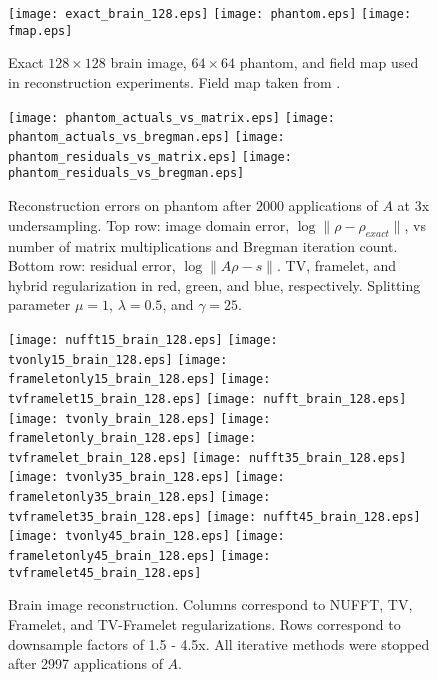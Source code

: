 \documentclass[12pt]{amsart}
\theoremstyle{remark}
\begin{document}
\begin{center}
\begin{figure}[h!]
\texttt{[image: exact\_brain\_128.eps]}
\texttt{[image: phantom.eps]}
\texttt{[image: fmap.eps]}
\caption{Exact $128 \times 128$ brain image, $64 \times 64$ phantom, and field map used in reconstruction experiments. Field map taken from \cite{Fessler2003}.}
\end{figure}
\end{center}


\begin{center}
\begin{figure}[h!]
\texttt{[image: phantom\_actuals\_vs\_matrix.eps]}
\texttt{[image: phantom\_actuals\_vs\_bregman.eps]}
\linebreak
\texttt{[image: phantom\_residuals\_vs\_matrix.eps]}
\texttt{[image: phantom\_residuals\_vs\_bregman.eps]}
\caption{Reconstruction errors on phantom after $2000$ applications of $A$ at $3$x undersampling. Top row: image domain error, $\log \| \rho - \rho_{exact}\|$, vs number of matrix multiplications and Bregman iteration count. Bottom row: residual error, $\log \| A\rho - s \|$. TV, framelet, and hybrid regularization in red, green, and blue, respectively. Splitting parameter $\mu=1$, $\lambda=0.5$, and $\gamma=25$.}
\end{figure}
\end{center}

\begin{center}
\begin{figure}[h!]
\texttt{[image: nufft15\_brain\_128.eps]}
\texttt{[image: tvonly15\_brain\_128.eps]}
\texttt{[image: frameletonly15\_brain\_128.eps]}
\texttt{[image: tvframelet15\_brain\_128.eps]}
\linebreak
\texttt{[image: nufft\_brain\_128.eps]}
\texttt{[image: tvonly\_brain\_128.eps]}
\texttt{[image: frameletonly\_brain\_128.eps]}
\texttt{[image: tvframelet\_brain\_128.eps]}
\linebreak
\texttt{[image: nufft35\_brain\_128.eps]}
\texttt{[image: tvonly35\_brain\_128.eps]}
\texttt{[image: frameletonly35\_brain\_128.eps]}
\texttt{[image: tvframelet35\_brain\_128.eps]}
\linebreak
\texttt{[image: nufft45\_brain\_128.eps]}
\texttt{[image: tvonly45\_brain\_128.eps]}
\texttt{[image: frameletonly45\_brain\_128.eps]}
\texttt{[image: tvframelet45\_brain\_128.eps]}
\caption{Brain image reconstruction. Columns correspond to NUFFT, TV, Framelet, and TV-Framelet regularizations. Rows correspond to downsample factors of 1.5 - 4.5x. All iterative methods were stopped after 2997 applications of $A$.}
\end{figure}
\end{center}
\end{document}

